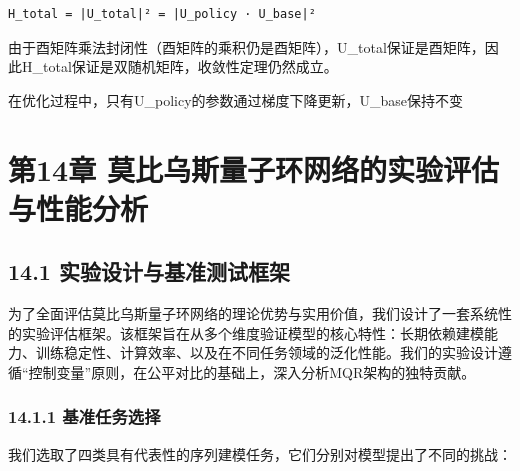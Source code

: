 \documentclass[
  12pt,
]{article}
\begin{document}
\begin{verbatim}
H_total = |U_total|² = |U_policy · U_base|²
\end{verbatim}

由于酉矩阵乘法封闭性（酉矩阵的乘积仍是酉矩阵），U\_total保证是酉矩阵，因此H\_total保证是双随机矩阵，收敛性定理仍然成立。

在优化过程中，只有U\_policy的参数通过梯度下降更新，U\_base保持不变

\hypertarget{ux7b2c14ux7ae0-ux83abux6bd4ux4e4cux65afux91cfux5b50ux73afux7f51ux7edcux7684ux5b9eux9a8cux8bc4ux4f30ux4e0eux6027ux80fdux5206ux6790}{%
\section{第14章
莫比乌斯量子环网络的实验评估与性能分析}\label{ux7b2c14ux7ae0-ux83abux6bd4ux4e4cux65afux91cfux5b50ux73afux7f51ux7edcux7684ux5b9eux9a8cux8bc4ux4f30ux4e0eux6027ux80fdux5206ux6790}}

\hypertarget{ux5b9eux9a8cux8bbeux8ba1ux4e0eux57faux51c6ux6d4bux8bd5ux6846ux67b6}{%
\subsection{14.1
实验设计与基准测试框架}\label{ux5b9eux9a8cux8bbeux8ba1ux4e0eux57faux51c6ux6d4bux8bd5ux6846ux67b6}}

为了全面评估莫比乌斯量子环网络的理论优势与实用价值，我们设计了一套系统性的实验评估框架。该框架旨在从多个维度验证模型的核心特性：长期依赖建模能力、训练稳定性、计算效率、以及在不同任务领域的泛化性能。我们的实验设计遵循``控制变量''原则，在公平对比的基础上，深入分析MQR架构的独特贡献。

\hypertarget{ux57faux51c6ux4efbux52a1ux9009ux62e9}{%
\subsubsection{14.1.1
基准任务选择}\label{ux57faux51c6ux4efbux52a1ux9009ux62e9}}

我们选取了四类具有代表性的序列建模任务，它们分别对模型提出了不同的挑战：
\end{document}
